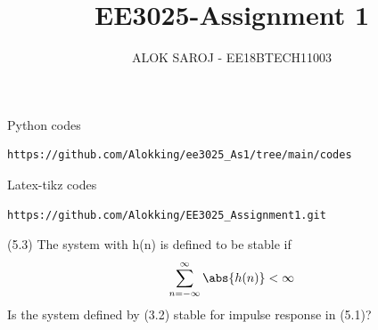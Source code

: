 \documentclass[journal,12pt,twocolumn]{IEEEtran}
\begin{document}
\def\rightbox#1{\makebox[0in][r]{#1}}
\def\centbox#1{\makebox[0in]{#1}}
\def\topbox#1{\raisebox{-\baselineskip}[0in][0in]{#1}}
\def\midbox#1{\raisebox{-0.5\baselineskip}[0in][0in]{#1}}
\vspace{3cm}
\title{EE3025-Assignment 1}
\author{ALOK SAROJ - EE18BTECH11003}
\maketitle
\newpage
\bigskip
\renewcommand{\thefigure}{\theenumi}
\renewcommand{\thetable}{\theenumi}
Python codes  
\begin{lstlisting}
https://github.com/Alokking/ee3025_As1/tree/main/codes
\end{lstlisting}
%
Latex-tikz codes
\begin{lstlisting}
https://github.com/Alokking/EE3025_Assignment1.git
\end{lstlisting}
(5.3) The system with h(n) is defined to be stable if 
\begin{align}
\sum_{n=-\infty}^{\infty} \abs{h(n)} < \infty
\end{align} 
Is the system defined by (3.2) stable for impulse response in (5.1)?
\end{document}
